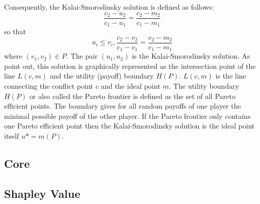 Consequently, the Kalai-Smorodinsky solution is defined as follows:
\[
\frac{c_2 - u_2}{c_1 - u_1} = \frac{c_2 - m_2}{c_1 - m_1}
\]
so that
\[
u_i \leq v_i, \frac{c_2 - v_2}{c_1 - v_1} = \frac{c_2 - m_2}{c_1 - m_1} 
\]
where $(v_1,v_2) \in P$. The pair $(u_1,u_2)$ is the Kalai-Smorodinsky solution. As \citet{kalai1975other} point out, this solution is graphically represented as the intersection point of the line $L(c,m)$ and the utility (payoff) boundary $H(P)$. $L(c,m)$ is the line connecting the conflict point $c$ and the ideal point $m$. The utility boundary $H(P)$ or also called the Pareto frontier is defined as the set of all Pareto efficient points. The boundary gives for all random payoffs of one player the minimal possible payoff of the other player.
If the Pareto frontier only contains one Pareto efficient point then the Kalai-Smorodinsky solution is the ideal point itself $u* = m(P)$.

\subsection{Core}

\subsection{Shapley Value}

